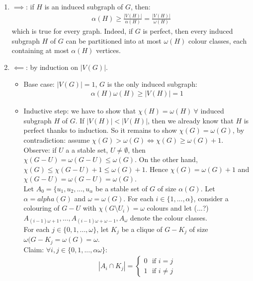 	\begin{enumerate}
		\item $\implies$: if $H$ is an induced subgraph of $G$, then:
			\begin{eqnarray}
				\alpha(H) \geq \frac{|V(H)|}{\alpha(H)} = \frac{|V(H)|}{\omega (H)}
			\end{eqnarray}
			which is true for every graph. Indeed, if $G$ is perfect, then every induced subgraph $H$ of $G$ can be partitioned into at most $\omega(H)$ colour classes, each containing at most $\alpha(H)$ vertices.
		\item $\impliedby$: by induction on $|V(G)|$.
			\begin{itemize}
				\item Base case: $|V(G)| =1$, $G$ is the only induced subgraph:\begin{eqnarray}
					\alpha(H) \omega(H) \geq |V(H)| = 1
				\end{eqnarray} 
				\item Inductive step: we have to show that $\chi(H) = \omega(H) ~\forall$ induced subgraph $H$ of $G$. If $|V(H)| < |V(H)|$, then we already know that $H$ is perfect thanks to induction. So it remains to show $\chi(G) = \omega(G)$, by contradiction: assume $\chi(G) > \omega(G) \iff \chi(G) \geq \omega(G) + 1$.\\
					
					Observe: if $U$ a a stable set, $U \neq \emptyset$, then $\chi(G-U) = \omega(G-U) \leq \omega(G)$. On the other hand, $\chi(G) \leq \chi(G-U) + 1 \leq \omega(G) + 1$. Hence $\chi(G) = \omega(G) + 1$ and $\chi(G-U) = \omega(G-U) = \omega(G)$.\\
					
					Let $A_0 = \{u_1, u_2, ..., u_{\alpha}$ be a stable set of $G$ of size $\alpha(G)$. Let $\alpha = alpha(G)$ and $\omega = \omega(G)$. For each $i \in \{1, ..., \alpha\}$, consider a colouring of $G - U$ with $\chi(G \setminus U_i) = \omega$ colours and let (...?) $A_{(i-1) \omega + 1}, ..., A_{(i-1) \omega + \omega - 1}, A_\omega$ denote the colour classes.\\
					
					For each $j \in \{0,1,..., \omega\}$, let $K_j$ be a clique of $G - K_j$ of size $\omega(G - K_j = \omega(G) = \omega$.\\
					
					Claim: $\forall i,j \in \{0,1,...,\alpha \omega \}$:
					\begin{eqnarray}
						|A_i \cap K_j| = \begin{cases}
							0 ~~~ \text{if } i = j\\
							1 ~~~ \text{if } i \neq j
						\end{cases}
					\end{eqnarray}
					

\end{itemize}
\end{enumerate}
